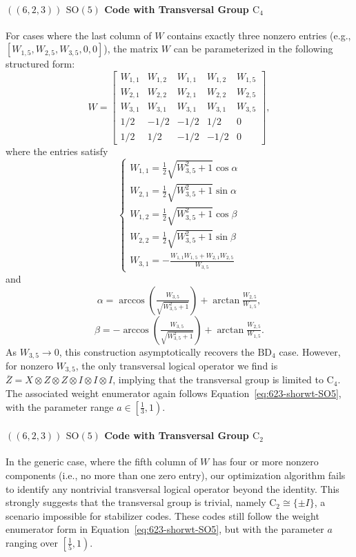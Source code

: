 \documentclass[8pt]{article}
\theoremstyle{definition}
\begin{document}
\paragraph{\texorpdfstring{$((6,2,3))$}{((6,2,3))} \texorpdfstring{$\mathrm{SO}(5)$}{SO(5)} Code with Transversal Group \texorpdfstring{$\mathrm{C}_4$}{C₄}}For cases where the last column of \(W\) contains exactly three nonzero entries (e.g., \([W_{1,5}, W_{2,5}, W_{3,5}, 0, 0]\)), the matrix \(W\) can be parameterized in the following structured form:
\[ W=\begin{bmatrix}
        W_{1,1} & W_{1,2} & W_{1,1} & W_{1,2} & W_{1,5} \\
        W_{2,1} & W_{2,2} & W_{2,1} & W_{2,2} & W_{2,5} \\
        W_{3,1} & W_{3,1} & W_{3,1} & W_{3,1} & W_{3,5} \\
        1/2     & -1/2    & -1/2    & 1/2     & 0       \\
        1/2     & 1/2     & -1/2    & -1/2    & 0
    \end{bmatrix},\]
where the entries satisfy
\[ \begin{cases}
        W_{1,1}=\frac{1}{2}\sqrt{W_{3,5}^{2}+1}\cos\alpha \\
        W_{2,1}=\frac{1}{2}\sqrt{W_{3,5}^{2}+1}\sin\alpha \\
        W_{1,2}=\frac{1}{2}\sqrt{W_{3,5}^{2}+1}\cos\beta  \\
        W_{2,2}=\frac{1}{2}\sqrt{W_{3,5}^{2}+1}\sin\beta  \\
        W_{3,1}=-\frac{W_{1,1}W_{1,5}+W_{2,1}W_{2,5}}{W_{3,5}}
    \end{cases} \]
and
\[ \alpha=\arccos\left(\tfrac{W_{3,5}}{\sqrt{W_{3,5}^{2}+1}}\right)+\arctan\tfrac{W_{2,5}}{W_{1,5}}, \]
\[ \beta=-\arccos\left(\tfrac{W_{3,5}}{\sqrt{W_{3,5}^{2}+1}}\right)+\arctan\tfrac{W_{2,5}}{W_{1,5}}. \]
As \(W_{3,5} \to 0\), this construction asymptotically recovers the \(\mathrm{BD}_4\) case. However, for nonzero \(W_{3,5}\), the only transversal logical operator we find is $\overline{Z}=X\otimes Z\otimes Z\otimes I\otimes I\otimes I$, implying that the transversal group is limited to \(\mathrm{C}_4\). The associated weight enumerator again follows Equation~\eqref{eq:623-shorwt-SO5}, with the parameter range \(a \in \left[\tfrac{1}{3}, 1\right)\).

\paragraph{\texorpdfstring{$((6,2,3))$}{((6,2,3))} \texorpdfstring{$\mathrm{SO}(5)$}{SO(5)} Code with Transversal Group \texorpdfstring{$\mathrm{C}_2$}{C₂}}In the generic case, where the fifth column of \(W\) has four or more nonzero components (i.e., no more than one zero entry), our optimization algorithm fails to identify any nontrivial transversal logical operator beyond the identity. This strongly suggests that the transversal group is trivial, namely \(\mathrm{C}_2 \cong \{\pm I\}\), a scenario impossible for stabilizer codes. These codes still follow the weight enumerator form in Equation~\eqref{eq:623-shorwt-SO5}, but with the parameter \(a\) ranging over \(\left[\tfrac{1}{5}, 1\right)\).
\end{document}
